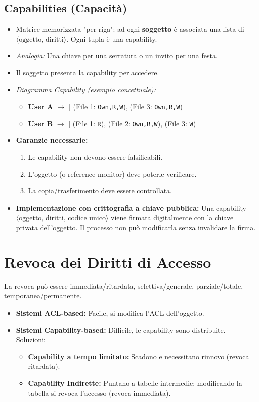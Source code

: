 \subsection{Capabilities (Capacità)}
\begin{itemize}
    \item Matrice memorizzata "per riga": ad ogni \textbf{soggetto} è associata una lista di $\langle \text{oggetto, diritti} \rangle$. Ogni tupla è una capability.
    \item \textit{Analogia:} Una chiave per una serratura o un invito per una festa.
    \item Il soggetto presenta la capability per accedere.
    \item \textit{Diagramma Capability (esempio concettuale):}
    \begin{itemize}
        \item \textbf{User A} $\rightarrow$ [ (File 1: \texttt{Own,R,W}), (File 3: \texttt{Own,R,W}) ]
        \item \textbf{User B} $\rightarrow$ [ (File 1: \texttt{R}), (File 2: \texttt{Own,R,W}), (File 3: \texttt{W}) ]
    \end{itemize}
    \item \textbf{Garanzie necessarie:}
    \begin{enumerate}
        \item Le capability non devono essere falsificabili.
        \item L'oggetto (o reference monitor) deve poterle verificare.
        \item La copia/trasferimento deve essere controllata.
    \end{enumerate}
    \item \textbf{Implementazione con crittografia a chiave pubblica:}
    Una capability $\langle \text{oggetto, diritti, codice\_unico} \rangle$ viene firmata digitalmente con la chiave privata dell'oggetto. Il processo non può modificarla senza invalidare la firma.
\end{itemize}

\section{Revoca dei Diritti di Accesso}
La revoca può essere immediata/ritardata, selettiva/generale, parziale/totale, temporanea/permanente.
\begin{itemize}
    \item \textbf{Sistemi ACL-based:} Facile, si modifica l'ACL dell'oggetto.
    \item \textbf{Sistemi Capability-based:} Difficile, le capability sono distribuite. Soluzioni:
    \begin{itemize}
        \item \textbf{Capability a tempo limitato:} Scadono e necessitano rinnovo (revoca ritardata).
        \item \textbf{Capability Indirette:} Puntano a tabelle intermedie; modificando la tabella si revoca l'accesso (revoca immediata).
    \end{itemize}
\end{itemize}

